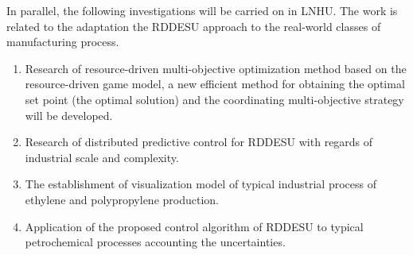 \documentclass[conference,a4paper]{IEEEtran}
\begin{document}
In parallel, the following investigations will be carried on in LNHU. The work is related to the adaptation the RDDESU approach to the real-world classes of manufacturing process.
\begin{enumerate}

\item Research of resource-driven multi-objective optimization method based on the resource-driven game model, a new efficient method for obtaining the optimal set point (the optimal solution) and the coordinating multi-objective strategy will be developed. %
\item Research of distributed predictive control for RDDESU with regards of industrial scale and complexity.
\item The establishment of visualization model of typical industrial process of ethylene and polypropylene production.
\item Application of the proposed control algorithm of RDDESU to typical petrochemical processes accounting the uncertainties.
\end{enumerate}
\end{document}
